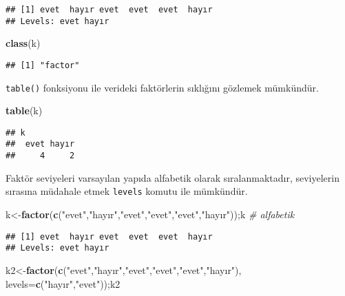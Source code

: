 \documentclass[
]{book}
\newenvironment{Shaded}{\begin{snugshade}}{\end{snugshade}}
\newcommand{\CommentTok}[1]{\textcolor[rgb]{0.56,0.35,0.01}{\textit{#1}}}
\newcommand{\DataTypeTok}[1]{\textcolor[rgb]{0.13,0.29,0.53}{#1}}
\newcommand{\KeywordTok}[1]{\textcolor[rgb]{0.13,0.29,0.53}{\textbf{#1}}}
\newcommand{\NormalTok}[1]{#1}
\newcommand{\StringTok}[1]{\textcolor[rgb]{0.31,0.60,0.02}{#1}}
\begin{document}
\begin{verbatim}
## [1] evet  hayır evet  evet  evet  hayır
## Levels: evet hayır
\end{verbatim}

\begin{Shaded}
\begin{Highlighting}[]
\KeywordTok{class}\NormalTok{(k)}
\end{Highlighting}
\end{Shaded}

\begin{verbatim}
## [1] "factor"
\end{verbatim}

\texttt{table()} fonksiyonu ile verideki faktörlerin sıklığını gözlemek mümkündür.

\begin{Shaded}
\begin{Highlighting}[]
\KeywordTok{table}\NormalTok{(k)}
\end{Highlighting}
\end{Shaded}

\begin{verbatim}
## k
##  evet hayır
##     4     2
\end{verbatim}

Faktör seviyeleri varsayılan yapıda alfabetik olarak sıralanmaktadır, seviyelerin sırasına müdahale etmek \texttt{levels} komutu ile mümkündür.

\begin{Shaded}
\begin{Highlighting}[]
\NormalTok{k<-}\KeywordTok{factor}\NormalTok{(}\KeywordTok{c}\NormalTok{(}\StringTok{"evet"}\NormalTok{,}\StringTok{"hayır"}\NormalTok{,}\StringTok{"evet"}\NormalTok{,}\StringTok{"evet"}\NormalTok{,}\StringTok{"evet"}\NormalTok{,}\StringTok{"hayır"}\NormalTok{));k  }\CommentTok{# alfabetik}
\end{Highlighting}
\end{Shaded}

\begin{verbatim}
## [1] evet  hayır evet  evet  evet  hayır
## Levels: evet hayır
\end{verbatim}

\begin{Shaded}
\begin{Highlighting}[]
\NormalTok{k2<-}\KeywordTok{factor}\NormalTok{(}\KeywordTok{c}\NormalTok{(}\StringTok{"evet"}\NormalTok{,}\StringTok{"hayır"}\NormalTok{,}\StringTok{"evet"}\NormalTok{,}\StringTok{"evet"}\NormalTok{,}\StringTok{"evet"}\NormalTok{,}\StringTok{"hayır"}\NormalTok{), }\DataTypeTok{levels=}\KeywordTok{c}\NormalTok{(}\StringTok{"hayır"}\NormalTok{,}\StringTok{"evet"}\NormalTok{));k2}
\end{Highlighting}
\end{Shaded}
\end{document}
